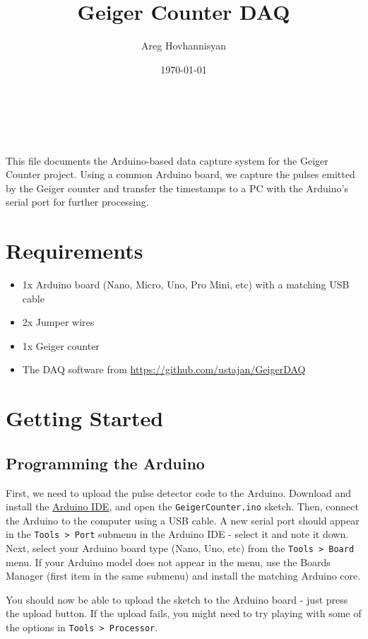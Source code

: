 \documentclass[11pt]{article}
\author{Areg Hovhannisyan}
\date{\today}
\title{Geiger Counter DAQ}
\renewcommand{\maketitle}{\begin{center}\textsf{ {\Huge\bfseries\thetitle}\\\vspace{0.5em}\theauthor\\\vspace{0.5em}\thedate}\end{center}}
\begin{document}
\maketitle
This file documents the Arduino-based data capture system for the Geiger Counter project. Using a common Arduino board, we capture the pulses emitted by the Geiger counter and transfer the timestamps to a PC with the Arduino's serial port for further processing.

\tableofcontents
{}

\section{Requirements}
\label{sec:org36dd43c}
\begin{itemize}
\item 1x Arduino board (Nano, Micro, Uno, Pro Mini, etc) with a matching USB cable
\item 2x Jumper wires
\item 1x Geiger counter
\item The DAQ software from \url{https://github.com/ustajan/GeigerDAQ}
\end{itemize}


\section{Getting Started}
\label{sec:org3936b99}
\subsection{Programming the Arduino}
\label{sec:org67cf4d3}
First, we need to upload the pulse detector code to the Arduino. Download and install the \href{https://docs.arduino.cc/software/ide-v1}{Arduino IDE}, and open the \texttt{GeigerCounter.ino} sketch. Then, connect the Arduino to the computer using a USB cable. A new serial port should appear in the \texttt{Tools > Port} submenu in the Arduino IDE - select it and note it down. Next, select your Arduino board type (Nano, Uno, etc) from the \texttt{Tools > Board} menu. If your Arduino model does not appear in the menu, use the Boards Manager (first item in the same submenu) and install the matching Arduino core.

You should now be able to upload the sketch to the Arduino board - just press the upload button. If the upload fails, you might need to try playing with some of the options in \texttt{Tools > Processor}.
\end{document}
